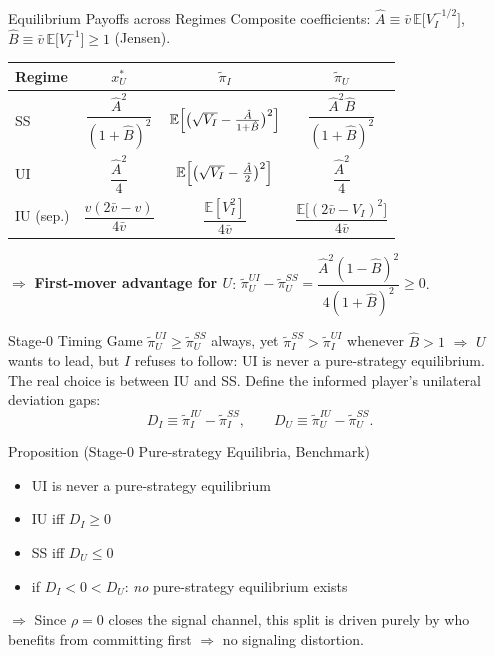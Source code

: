 \documentclass[aspectratio=169, 12pt]{beamer}
\newcommand{\E}{\mathbb{E}}
\begin{document}
\begin{frame}{Equilibrium Payoffs across Regimes}
  Composite coefficients:
  $\hat A \equiv \bar v\,\E\bigl[V_I^{-1/2}\bigr]$,
  $\hat B \equiv \bar v\,\E\bigl[V_I^{-1}\bigr] \ge 1$ (Jensen).

  \begin{center}
    \small
    \renewcommand{\arraystretch}{1.8}
    \begin{tabular}{@{}lccc@{}}
      \toprule
      Regime & $x_U^*$ & $\widetilde\pi_I$ & $\widetilde\pi_U$\\
      \midrule
      SS
        & $\dfrac{\hat A^2}{(1+\hat B)^2}$
        & $\E\Bigl[\bigl(\sqrt{V_I} - \tfrac{\hat A}{1+\hat B}\bigr)^2\Bigr]$
        & $\dfrac{\hat A^2 \hat B}{(1+\hat B)^2}$ \\
      UI
        & $\dfrac{\hat A^2}{4}$
        & $\E\Bigl[\bigl(\sqrt{V_I} - \tfrac{\hat A}{2}\bigr)^2\Bigr]$
        & $\dfrac{\hat A^2}{4}$ \\
      IU (sep.)
        & $\dfrac{v(2\bar v - v)}{4\bar v}$
        & $\dfrac{\E[V_I^2]}{4\bar v}$
        & $\dfrac{\E\bigl[(2\bar v - V_I)^2\bigr]}{4\bar v}$ \\
      \bottomrule
    \end{tabular}
  \end{center}

  $\Rightarrow$ \textbf{First-mover advantage for $U$}:
  $\widetilde\pi_U^{UI} - \widetilde\pi_U^{SS}
    = \dfrac{\hat A^2 (1-\hat B)^2}{4(1+\hat B)^2} \ge 0$.
\end{frame}

\begin{frame}{Stage-0 Timing Game}
  $\widetilde\pi_U^{UI} \ge \widetilde\pi_U^{SS}$ always, yet
  $\widetilde\pi_I^{SS} > \widetilde\pi_I^{UI}$ whenever $\hat B > 1$ $\Rightarrow$
  $U$ wants to lead, but $I$ refuses to follow: UI is never a
  pure-strategy equilibrium. The real choice is between IU and SS.
  Define the informed player's unilateral deviation gaps:
  \[
    D_I \equiv \widetilde\pi_I^{IU} - \widetilde\pi_I^{SS},
    \qquad
    D_U \equiv \widetilde\pi_U^{IU} - \widetilde\pi_U^{SS}.
  \]

  \begin{block}{Proposition (Stage-0 Pure-strategy Equilibria, Benchmark)}
    \begin{itemize}\setlength{\itemsep}{0.2em}
      \item UI is never a pure-strategy equilibrium
      \item IU \; iff \; $D_I \ge 0$
      \item SS \; iff \; $D_U \le 0$
      \item if $D_I < 0 < D_U$: \emph{no} pure-strategy equilibrium exists
    \end{itemize}
  \end{block}

  $\Rightarrow$ Since $\rho = 0$ closes the signal channel, this split is driven
  purely by who benefits from committing first $\Rightarrow$ no signaling distortion.
\end{frame}
\end{document}
